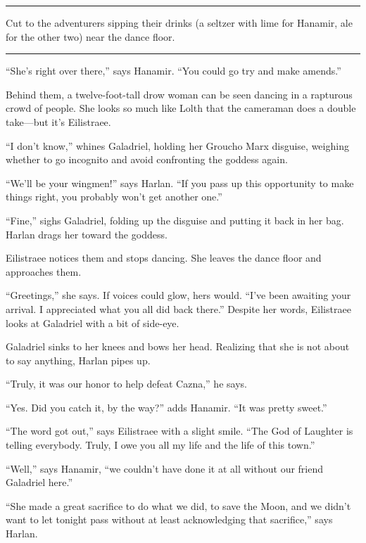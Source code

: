 \documentclass[smalldemyvopaper,11pt,twoside,onecolumn,openright,extrafontsizes]{memoir}
\begin{document}
\begin{center}\rule{0.5\linewidth}{\linethickness}\end{center}

Cut to the adventurers sipping their drinks (a seltzer with lime for
Hanamir, ale for the other two) near the dance floor.

\begin{center}\rule{0.5\linewidth}{\linethickness}\end{center}

``She's right over there,'' says Hanamir. ``You could go try and make
amends.''

Behind them, a twelve-foot-tall drow woman can be seen dancing in a
rapturous crowd of people. She looks so much like Lolth that the
cameraman does a double take---but it's Eilistraee.

``I don't know,'' whines Galadriel, holding her Groucho Marx disguise,
weighing whether to go incognito and avoid confronting the goddess
again.

``We'll be your wingmen!'' says Harlan. ``If you pass up this
opportunity to make things right, you probably won't get another one.''

``Fine,'' sighs Galadriel, folding up the disguise and putting it back
in her bag. Harlan drags her toward the goddess.

Eilistraee notices them and stops dancing. She leaves the dance floor
and approaches them.

``Greetings,'' she says. If voices could glow, hers would. ``I've been
awaiting your arrival. I appreciated what you all did back there.''
Despite her words, Eilistraee looks at Galadriel with a bit of side-eye.

Galadriel sinks to her knees and bows her head. Realizing that she is
not about to say anything, Harlan pipes up.

``Truly, it was our honor to help defeat Cazna,'' he says.

``Yes. Did you catch it, by the way?'' adds Hanamir. ``It was pretty
sweet.''

``The word got out,'' says Eilistraee with a slight smile. ``The God of
Laughter is telling everybody. Truly, I owe you all my life and the life
of this town.''

``Well,'' says Hanamir, ``we couldn't have done it at all without our
friend Galadriel here.''

``She made a great sacrifice to do what we did, to save the Moon, and we
didn't want to let tonight pass without at least acknowledging that
sacrifice,'' says Harlan.
\end{document}
